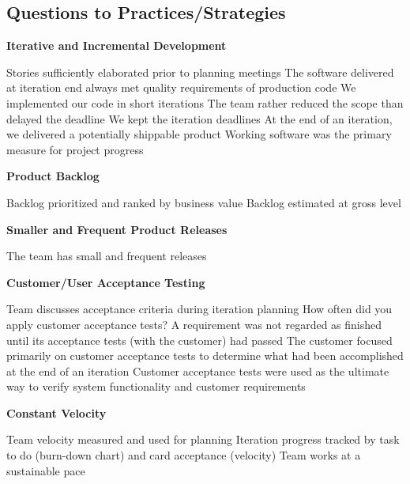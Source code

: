 \vspace{0.5cm}

\subsection{Questions to Practices/Strategies}

\textbf{Iterative and Incremental Development}
\begin{itemize}
	\taa Stories sufficiently elaborated prior to planning meetings
	\pam The software delivered at iteration end always met quality requirements of production code 
	\pam We implemented our code in short iterations
	\pamr The team rather reduced the scope than delayed the deadline 
	\pamr We kept the iteration deadlines
	\pamr At the end of an iteration, we delivered a potentially shippable product
	\pamr Working software was the primary measure for project progress
\end{itemize}

\textbf{Product Backlog}
\begin{itemize}
	\taa Backlog prioritized and ranked by business value
	\taa Backlog estimated at gross level
\end{itemize}

\textbf{Smaller and Frequent Product Releases}
\begin{itemize}
	\taa The team has small and frequent releases
\end{itemize}

\textbf{Customer/User Acceptance Testing}
\begin{itemize}
	\taa Team discusses acceptance criteria during iteration planning
	\pam How often did you apply customer acceptance tests?
	\pam A requirement was not regarded as finished until its acceptance tests (with the customer) had passed 
	\pamr The customer focused primarily on customer acceptance tests to determine what had been accomplished at the end of an iteration
	\pamr Customer acceptance tests were used as the ultimate way to verify system functionality and customer requirements 
\end{itemize}

\textbf{Constant Velocity}
\begin{itemize}
	\taa Team velocity measured and used for planning
	\taa Iteration progress tracked by task to do (burn-down chart) and card acceptance (velocity)
	\taa Team works at a sustainable pace 
\end{itemize}

